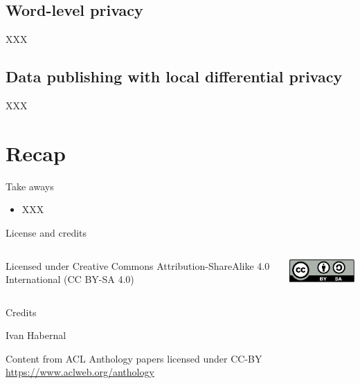 \documentclass[12pt,aspectratio=169,handout]{beamer}
\begin{document}
\subsection{Word-level privacy}

\begin{frame}{XXX}
	
\end{frame}

\subsection{Data publishing with local differential privacy}

\begin{frame}{XXX}
	
\end{frame}



\section*{Recap}

\begin{frame}{Take aways}
	
\begin{itemize}
	
	\item XXX
\end{itemize}
	
\end{frame}



\begin{frame}{License and credits}

	\begin{columns}
		\begin{column}{0.7\textwidth}
			Licensed under Creative Commons Attribution-ShareAlike 4.0 International (CC BY-SA 4.0)
		\end{column}
		\begin{column}{0.2\textwidth}
			\includegraphics[width=0.9\linewidth]{img/cc-by-sa-icon.pdf}
		\end{column}
	\end{columns}
	
	\bigskip
	
	Credits
	
	\begin{scriptsize}
		
		Ivan Habernal
		
		Content from ACL Anthology papers licensed under CC-BY \url{https://www.aclweb.org/anthology}
		
	\end{scriptsize}
	
\end{frame}
\end{document}
